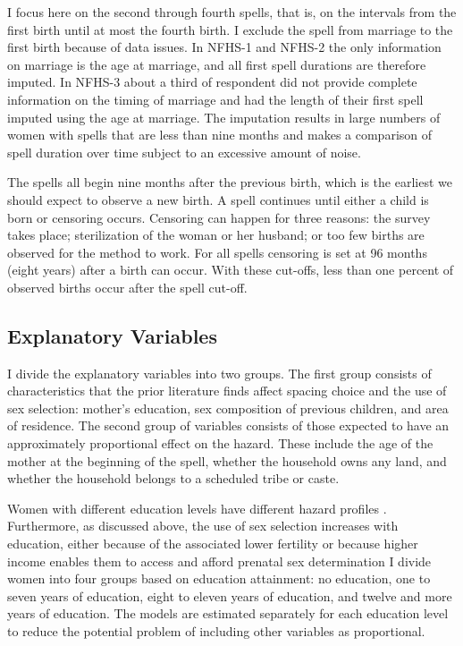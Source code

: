 \documentclass[12pt,letterpaper]{article}
\begin{document}
I focus here on the second through fourth spells, that is, on the intervals from the first 
birth until at most the fourth birth.
I exclude the spell from marriage to the first birth because of data issues.
In NFHS-1 and NFHS-2 the only information on marriage is the age at marriage, and 
all first spell durations are therefore imputed.
In NFHS-3 about a third of respondent did not provide complete information on the
timing of marriage and had the length of their first spell imputed using the age at 
marriage.
The imputation results in large numbers of women with spells that are less than nine 
months and makes a comparison of spell duration over time subject to an 
excessive amount of noise.

The spells all begin nine months after the previous birth, which is the earliest we should 
expect to observe a new birth.
A spell continues until either a child is born or censoring occurs.
Censoring can happen for three reasons:
the survey takes place;
sterilization of the woman or her husband;
or too few births are observed for the method to work.
For all spells censoring is set at 96 months (eight years) after a birth can occur.
With these cut-offs, less than one percent of observed births occur after
the spell cut-off.

% 


\subsection{Explanatory Variables}

I divide the explanatory variables into two groups.
The first group consists of characteristics that the prior literature finds affect 
spacing choice and the use of sex selection:
mother's education, sex composition of previous children, and area of residence.
The second group of variables consists of those expected to have an approximately 
proportional effect on the hazard.
These include the age of the mother at the beginning of the spell, whether the household 
owns any land, and whether the household belongs to a scheduled tribe or caste.

Women with different education levels have different hazard profiles
\citep{Whitworth2002,Bhalotra2008,Kim2010}.
Furthermore, as discussed above, the use of sex selection increases with education, 
either because of the associated lower fertility or because higher income enables them 
to access and afford prenatal sex determination
I divide women into four groups based on education attainment: no
education, one to seven years of education, eight to eleven years of education,
and twelve and more years of education.
The models are estimated separately for each education level to reduce the potential 
problem of including other variables as proportional.
\end{document}
